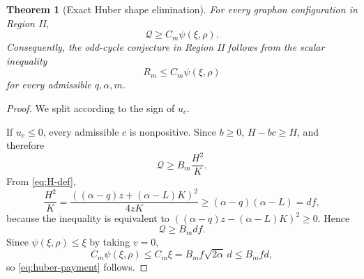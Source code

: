 \documentclass[11pt]{article}
\newtheorem{theorem}{Theorem}[section]
\newcommand{\cQ}{\mathcal Q}
\begin{document}
\begin{theorem}[Exact Huber shape elimination]\label{thm:huber-elim}
For every graphon configuration in Region II,
\begin{equation}\label{eq:huber-payment}
        \cQ\ge C_m\psi(\xi,\rho).
\end{equation}
Consequently, the odd-cycle conjecture in Region II follows from the
scalar inequality
\begin{equation}\label{eq:scalar-huber}
        R_m\le C_m\psi(\xi,\rho)
\end{equation}
for every admissible $q,\alpha,m$.
\end{theorem}

\begin{proof}
We split according to the sign of $u_c$.

If $u_c\le0$, every admissible $c$ is nonpositive.  Since $b\ge0$,
$H-bc\ge H$, and therefore
\[
        \cQ\ge B_m\frac{H^2}{K}.
\]
From \eqref{eq:H-def},
\[
        \frac{H^2}{K}
        =\frac{((\alpha-q)z+(\alpha-L)K)^2}{4zK}
        \ge (\alpha-q)(\alpha-L)=df,
\]
because the inequality is equivalent to
$((\alpha-q)z-(\alpha-L)K)^2\ge0$.  Hence
\[
        \cQ\ge B_mdf.
\]
Since $\psi(\xi,\rho)\le\xi$ by taking $v=0$,
\[
        C_m\psi(\xi,\rho)
        \le C_m\xi
        =B_mf\sqrt{2\alpha}\,d
        \le B_mfd,
\]
so \eqref{eq:huber-payment} follows.


\end{proof}
\end{document}
